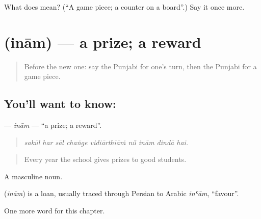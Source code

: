 \begin{tcolorbox}[breakable,colback=teal!4,colframe=teal!35!black,title={Before you move on}]
What does  mean? (\textquotedblleft{}A game piece; a counter on a board\textquotedblright{}.) Say it once more.
\end{tcolorbox}
\section[\texorpdfstring{\pa{ਇਨਾਮ} (inām)}{ਇਨਾਮ (inām)}]{ (inām) — a prize; a reward}

\label{lesson:PA-C352-inam}



\begin{quote}
Before the new one: say the Punjabi for one's turn, then the Punjabi for a game piece.
\end{quote}

\subsection*{You'll want to know: }
\textbf{} — \emph{inām} — \textquotedblleft{}a prize; a reward\textquotedblright{}.

\begin{quote}
        
\end{quote}

\begin{quote}
\emph{sakūl har sāl chaṅge vidiārthīāṁ nū̃ inām dindā hai.}
\end{quote}

\begin{quote}
Every year the school gives prizes to good students.
\end{quote}

A masculine noun.

\begin{cousinweb}
\textbf{} (\emph{inām}) is a loan, usually traced through Persian to Arabic \emph{inʿām}, \textquotedblleft{}favour\textquotedblright{}.
\end{cousinweb}

\begin{grammarlens}[title={What you've built}]
One more word for this chapter.
\end{grammarlens}

